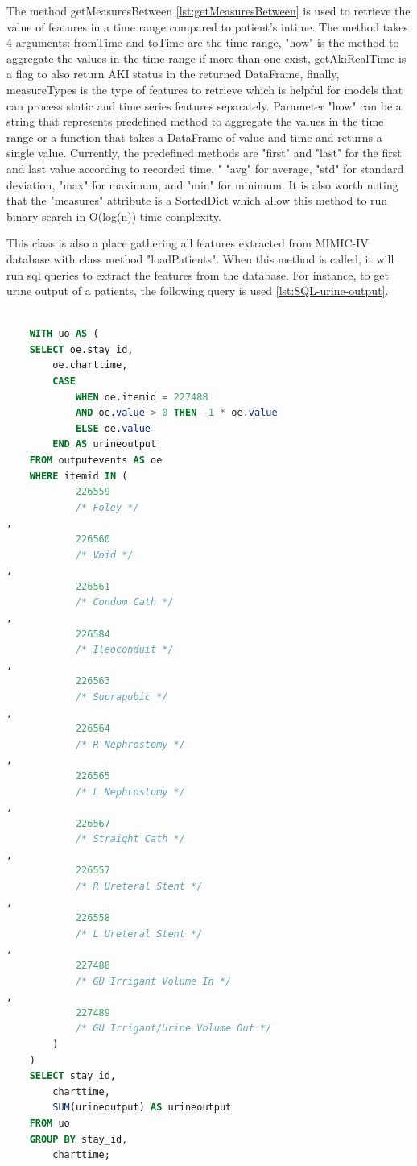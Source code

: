 \documentclass[../main.tex]{subfiles}
\begin{document}
The method getMeasuresBetween \ref{lst:getMeasuresBetween} is used to retrieve the value of features in a time range compared to patient's intime.
The method takes 4 arguments: fromTime and toTime are the time range, "how" is the method to aggregate the values in the time range if more than one exist, getAkiRealTime is a flag to also return AKI status in the returned DataFrame, finally, measureTypes is the type of features to retrieve which is helpful for models that can process static and time series features separately.
Parameter "how" can be a string that represents predefined method to aggregate the values in the time range or a function that takes a DataFrame of value and time and returns a single value.
Currently, the predefined methods are "first" and "last" for the first and last value according to recorded time, " "avg" for average, "std" for standard deviation, "max" for maximum, and "min" for minimum.
It is also worth noting that the "measures" attribute is a SortedDict which allow this method to run binary search in O(log(n)) time complexity.

This class is also a place gathering all features extracted from MIMIC-IV database with class method "loadPatients".
When this method is called, it will run sql queries to extract the features from the database.
For instance, to get urine output of a patients, the following query is used \ref{lst:SQL-urine-output}.

\begin{lstlisting}[language=SQL, caption={SQL query to get urine output}, label={lst:SQL-urine-output}]

    WITH uo AS (
    SELECT oe.stay_id,
        oe.charttime,
        CASE
            WHEN oe.itemid = 227488
            AND oe.value > 0 THEN -1 * oe.value
            ELSE oe.value
        END AS urineoutput
    FROM outputevents AS oe
    WHERE itemid IN (
            226559
            /* Foley */
,
            226560
            /* Void */
,
            226561
            /* Condom Cath */
,
            226584
            /* Ileoconduit */
,
            226563
            /* Suprapubic */
,
            226564
            /* R Nephrostomy */
,
            226565
            /* L Nephrostomy */
,
            226567
            /* Straight Cath */
,
            226557
            /* R Ureteral Stent */
,
            226558
            /* L Ureteral Stent */
,
            227488
            /* GU Irrigant Volume In */
,
            227489
            /* GU Irrigant/Urine Volume Out */
        )
    )
    SELECT stay_id,
        charttime,
        SUM(urineoutput) AS urineoutput
    FROM uo
    GROUP BY stay_id,
        charttime;

\end{lstlisting}
\end{document}
